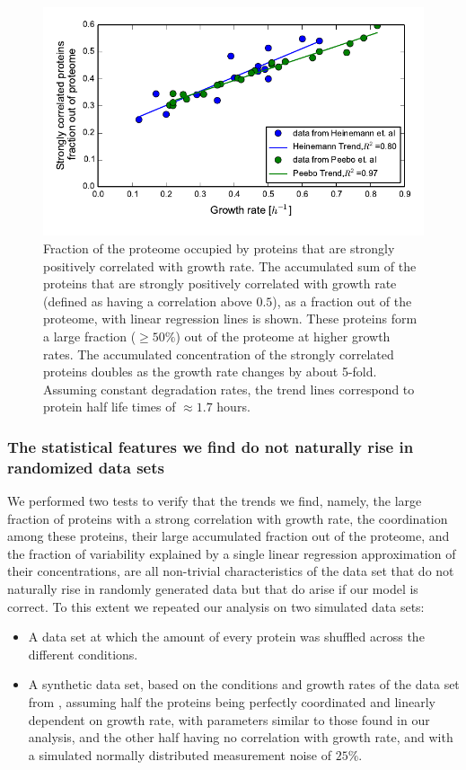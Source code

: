 \documentclass[a4paper]{article}
\begin{document}
\begin{figure}[H]
\begin{center}
\includegraphics[width=1\columnwidth]{GlobalClusterGRFit.pdf}
\caption{\label{fig:globalgrcorr}
Fraction of the proteome occupied by proteins that are strongly positively correlated with growth rate.
The accumulated sum of the proteins that are strongly positively correlated with growth rate (defined as having a correlation above $0.5$), as a fraction out of the proteome, with linear regression lines is shown.
These proteins form a large fraction ($\ge 50\%$) out of the proteome at higher growth rates.
The accumulated concentration of the strongly correlated proteins doubles as the growth rate changes by about 5-fold.
Assuming constant degradation rates, the trend lines correspond to protein half life times of $\approx 1.7$ hours.
}
\end{center}
\end{figure}

\subsubsection{The statistical features we find do not naturally rise in randomized data sets}
\label{randanalysis}
We performed two tests to verify that the trends we find, namely, the large fraction of proteins with a strong correlation with growth rate, the coordination among these proteins, their large accumulated fraction out of the proteome, and the fraction of variability explained by a single linear regression approximation of their concentrations, are all non-trivial characteristics of the data set that do not naturally rise in randomly generated data but that do arise if our model is correct.
To this extent we repeated our analysis on two simulated data sets:
\begin{itemize}
\item A data set at which the amount of every protein was shuffled across the different conditions.
\item A synthetic data set, based on the conditions and growth rates of the data set from \cite{Heinemann2015}, assuming half the proteins being perfectly coordinated and linearly dependent on growth rate, with parameters similar to those found in our analysis, and the other half having no correlation with growth rate, and with a simulated normally distributed measurement noise of $25\%$.
\end{itemize}
\end{document}
